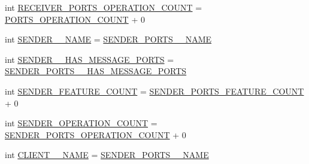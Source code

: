 \begin{DoxyCompactItemize}
\item 
int \hyperlink{interfaceshootingmachineemfmodel_1_1_shootingmachineemfmodel_package_a784cd8ee08945f45f89ceb08f5a717e5}{R\-E\-C\-E\-I\-V\-E\-R\-\_\-\-P\-O\-R\-T\-S\-\_\-\-O\-P\-E\-R\-A\-T\-I\-O\-N\-\_\-\-C\-O\-U\-N\-T} = \hyperlink{interfaceshootingmachineemfmodel_1_1_shootingmachineemfmodel_package_a566f821cfd14b88ba5e0b60e966fb9f3}{P\-O\-R\-T\-S\-\_\-\-O\-P\-E\-R\-A\-T\-I\-O\-N\-\_\-\-C\-O\-U\-N\-T} + 0
\item 
int \hyperlink{interfaceshootingmachineemfmodel_1_1_shootingmachineemfmodel_package_a1ed828768d7bc69daa2e850c3d7dc8ac}{S\-E\-N\-D\-E\-R\-\_\-\-\_\-\-N\-A\-M\-E} = \hyperlink{interfaceshootingmachineemfmodel_1_1_shootingmachineemfmodel_package_a399a22f7885ad9687ceee392efd75115}{S\-E\-N\-D\-E\-R\-\_\-\-P\-O\-R\-T\-S\-\_\-\-\_\-\-N\-A\-M\-E}
\item 
int \hyperlink{interfaceshootingmachineemfmodel_1_1_shootingmachineemfmodel_package_a7e39218752c6badebdd62172a1e09cf9}{S\-E\-N\-D\-E\-R\-\_\-\-\_\-\-H\-A\-S\-\_\-\-M\-E\-S\-S\-A\-G\-E\-\_\-\-P\-O\-R\-T\-S} = \hyperlink{interfaceshootingmachineemfmodel_1_1_shootingmachineemfmodel_package_a32f9aba86ce59940c62b442308c4bf7d}{S\-E\-N\-D\-E\-R\-\_\-\-P\-O\-R\-T\-S\-\_\-\-\_\-\-H\-A\-S\-\_\-\-M\-E\-S\-S\-A\-G\-E\-\_\-\-P\-O\-R\-T\-S}
\item 
int \hyperlink{interfaceshootingmachineemfmodel_1_1_shootingmachineemfmodel_package_a8a9aaa95507322260fbb9649b67d5539}{S\-E\-N\-D\-E\-R\-\_\-\-F\-E\-A\-T\-U\-R\-E\-\_\-\-C\-O\-U\-N\-T} = \hyperlink{interfaceshootingmachineemfmodel_1_1_shootingmachineemfmodel_package_a9db4c8b36712714f6168acc0e9fae4fa}{S\-E\-N\-D\-E\-R\-\_\-\-P\-O\-R\-T\-S\-\_\-\-F\-E\-A\-T\-U\-R\-E\-\_\-\-C\-O\-U\-N\-T} + 0
\item 
int \hyperlink{interfaceshootingmachineemfmodel_1_1_shootingmachineemfmodel_package_a9ed096474c4b1ffd51eb8c38df19abfc}{S\-E\-N\-D\-E\-R\-\_\-\-O\-P\-E\-R\-A\-T\-I\-O\-N\-\_\-\-C\-O\-U\-N\-T} = \hyperlink{interfaceshootingmachineemfmodel_1_1_shootingmachineemfmodel_package_ad4c59f12e4631c8b76762f9e81227dce}{S\-E\-N\-D\-E\-R\-\_\-\-P\-O\-R\-T\-S\-\_\-\-O\-P\-E\-R\-A\-T\-I\-O\-N\-\_\-\-C\-O\-U\-N\-T} + 0
\item 
int \hyperlink{interfaceshootingmachineemfmodel_1_1_shootingmachineemfmodel_package_a327d2d5d0a52b9b329eeca590d3a2b15}{C\-L\-I\-E\-N\-T\-\_\-\-\_\-\-N\-A\-M\-E} = \hyperlink{interfaceshootingmachineemfmodel_1_1_shootingmachineemfmodel_package_a399a22f7885ad9687ceee392efd75115}{S\-E\-N\-D\-E\-R\-\_\-\-P\-O\-R\-T\-S\-\_\-\-\_\-\-N\-A\-M\-E}

\end{DoxyCompactItemize}
